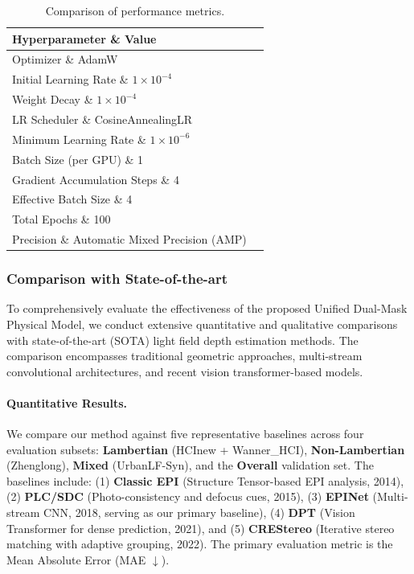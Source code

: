 \begin{table}[!t]
\caption{Comparison of performance metrics.}
\label{tab:comparison}
\centering
\begin{tabular}{ll}
\toprule
Hyperparameter \& Value \\
\midrule
Optimizer \& AdamW \\
Initial Learning Rate \& $1 \times 10^{-4}$ \\
Weight Decay \& $1 \times 10^{-4}$ \\
LR Scheduler \& CosineAnnealingLR \\
Minimum Learning Rate \& $1 \times 10^{-6}$ \\
Batch Size (per GPU) \& 1 \\
Gradient Accumulation Steps \& 4 \\
Effective Batch Size \& 4 \\
Total Epochs \& 100 \\
Precision \& Automatic Mixed Precision (AMP) \\
\bottomrule
\end{tabular}
\end{table}
\subsubsection{Comparison with State-of-the-art}

To comprehensively evaluate the effectiveness of the proposed Unified Dual-Mask Physical Model, we conduct extensive quantitative and qualitative comparisons with state-of-the-art (SOTA) light field depth estimation methods. The comparison encompasses traditional geometric approaches, multi-stream convolutional architectures, and recent vision transformer-based models. 

\paragraph{Quantitative Results.}

We compare our method against five representative baselines across four evaluation subsets: \textbf{Lambertian} (HCInew + Wanner\_HCI), \textbf{Non-Lambertian} (Zhenglong), \textbf{Mixed} (UrbanLF-Syn), and the \textbf{Overall} validation set. The baselines include: (1) \textbf{Classic EPI} (Structure Tensor-based EPI analysis, 2014), (2) \textbf{PLC/SDC} (Photo-consistency and defocus cues, 2015), (3) \textbf{EPINet} (Multi-stream CNN, 2018, serving as our primary baseline), (4) \textbf{DPT} (Vision Transformer for dense prediction, 2021), and (5) \textbf{CREStereo} (Iterative stereo matching with adaptive grouping, 2022). The primary evaluation metric is the Mean Absolute Error (MAE $\downarrow$). 


